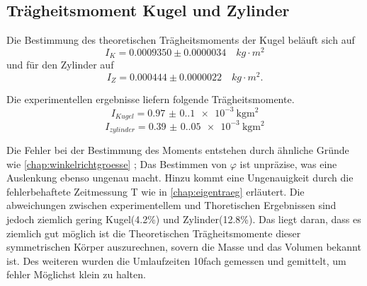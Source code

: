 \subsection{Trägheitsmoment Kugel und Zylinder}
\label{chap:kuzi}
Die Bestimmung des theoretischen Trägheitsmoments der Kugel beläuft sich auf
\begin{equation*}
    I_K = 0.0009350 \pm 0.0000034 \quad kg \cdot m^2
\end{equation*}
und für den Zylinder auf
\begin{equation*}
    I_Z = 0.000444 \pm 0.0000022 \quad kg \cdot m^2.
\end{equation*}

Die experimentellen ergebnisse liefern folgende Trägheitsmomente.
\begin{equation*}
    I_{Kugel} = \qty{0.97(0.1)e-3}{\kilo\gram\meter\squared}
\end{equation*}
\begin{equation*}
    I_{zylinder} = \qty{0.39(0.05)e-3}{\kilo\gram\meter\squared}
\end{equation*}

Die Fehler bei der Bestimmung des Moments entstehen durch ähnliche Gründe
wie \ref{chap:winkelrichtgroesse} ; Das Bestimmen von $\varphi$ ist unpräzise,
was eine Auslenkung ebenso ungenau macht. Hinzu kommt eine Ungenauigkeit 
durch die fehlerbehaftete Zeitmessung T wie in \ref{chap:eigentraeg} erläutert.
Die abweichungen zwischen experimentellem und Thoretischen Ergebnissen
sind jedoch ziemlich gering Kugel(4.2\%) und Zylinder(12.8\%). Das liegt daran, dass es ziemlich gut möglich ist die Theoretischen 
Trägheitsmomente dieser symmetrischen Körper auszurechnen, sovern die Masse und 
das Volumen bekannt ist. Des weiteren wurden die Umlaufzeiten 10fach gemessen und 
gemittelt, um fehler Möglichst klein zu halten.

